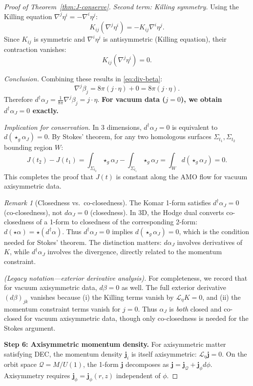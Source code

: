 \documentclass[12pt]{article}
\theoremstyle{plain}
\theoremstyle{definition}
\theoremstyle{remark}
\newtheorem{remark}[theorem]{Remark}
\newcommand{\momdens}{\boldsymbol{j}}
\begin{document}
\begin{proof}[Proof of Theorem~\ref{thm:J-conserve}]
\textit{Second term: Killing symmetry.} Using the Killing equation $\nabla^j \eta^i = -\nabla^i \eta^j$:
\[
K_{ij}(\nabla^j \eta^i) = -K_{ij}\nabla^i \eta^j.
\]
Since $K_{ij}$ is symmetric and $\nabla^i \eta^j$ is antisymmetric (Killing equation), their contraction vanishes:
\[
K_{ij}(\nabla^j \eta^i) = 0.
\]

\textit{Conclusion.} Combining these results in \eqref{eq:div-beta}:
\[
\nabla^j \beta_j = 8\pi(j \cdot \eta) + 0 = 8\pi(j \cdot \eta).
\]
Therefore $d^\dagger \alpha_J = \frac{1}{8\pi}\nabla^j \beta_j = j \cdot \eta$. \textbf{For vacuum data ($j = 0$), we obtain $d^\dagger \alpha_J = 0$ exactly.}

\textit{Implication for conservation.} In 3 dimensions, $d^\dagger \alpha_J = 0$ is equivalent to $d(\star_g \alpha_J) = 0$. By Stokes' theorem, for any two homologous surfaces $\Sigma_{t_1}, \Sigma_{t_2}$ bounding region $W$:
\[
J(t_2) - J(t_1) = \int_{\Sigma_{t_2}} \star_g \alpha_J - \int_{\Sigma_{t_1}} \star_g \alpha_J = \int_W d(\star_g \alpha_J) = 0.
\]
This completes the proof that $J(t)$ is constant along the AMO flow for vacuum axisymmetric data.

\begin{remark}[Closedness vs.~co-closedness]\label{rem:closed-vs-coclosed}
The Komar 1-form satisfies $d^\dagger \alpha_J = 0$ (co-closedness), not $d\alpha_J = 0$ (closedness). In 3D, the Hodge dual converts co-closedness of a 1-form to closedness of the corresponding 2-form: $d(\star \alpha) = \star(d^\dagger \alpha)$. Thus $d^\dagger \alpha_J = 0$ implies $d(\star_g \alpha_J) = 0$, which is the condition needed for Stokes' theorem. The distinction matters: $d\alpha_J$ involves derivatives of $K$, while $d^\dagger \alpha_J$ involves the divergence, directly related to the momentum constraint.
\end{remark}

\textit{(Legacy notation---exterior derivative analysis).} For completeness, we record that for vacuum axisymmetric data, $d\beta = 0$ as well. The full exterior derivative $(d\beta)_{jk}$ vanishes because (i) the Killing terms vanish by $\mathcal{L}_\eta K = 0$, and (ii) the momentum constraint terms vanish for $j = 0$. Thus $\alpha_J$ is \textit{both} closed and co-closed for vacuum axisymmetric data, though only co-closedness is needed for the Stokes argument.

\textbf{Step 6: Axisymmetric momentum density.}
For axisymmetric matter satisfying DEC, the momentum density $\momdens_i$ is itself axisymmetric: $\mathcal{L}_\eta \momdens = 0$. On the orbit space $\mathcal{Q} = M/U(1)$, the 1-form $\momdens$ decomposes as $\momdens = \momdens_{\mathcal{Q}} + \momdens_\phi d\phi$. Axisymmetry requires $\momdens_\phi = \momdens_\phi(r, z)$ independent of $\phi$.


\end{proof}
\end{document}
